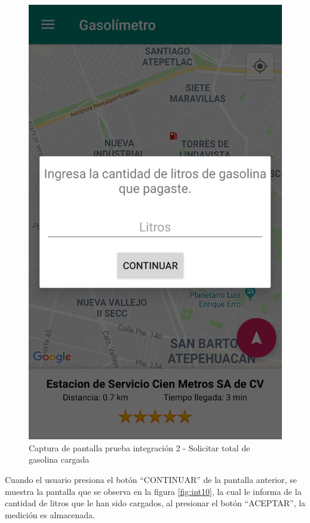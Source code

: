 \begin{figure}[H]
	\centering
	\includegraphics[scale=.2]{DocumentoTecnico/Capitulo6/integracion/Software/images/9.png}
	\caption{Captura de pantalla prueba integración 2 - Solicitar total de gasolina cargada}
	\label{fig:int9}
\end{figure}

Cuando el usuario presiona el botón ``CONTINUAR'' de la pantalla anterior, se muestra la pantalla que se observa en la figura \ref{fig:int10}, la cual le informa de la cantidad de litros que le han sido cargados, al presionar el botón ``ACEPTAR'', la medición es almacenada.


